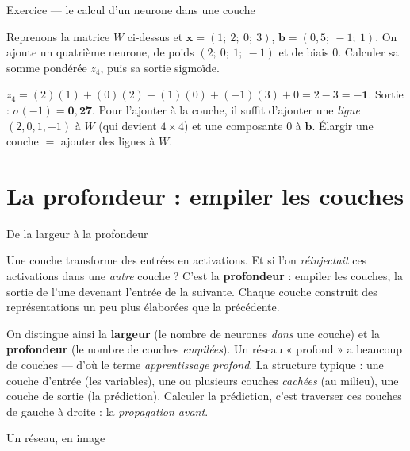 \documentclass[aspectratio=169,11pt]{beamer}
\newcommand{\vx}{\mathbf{x}}
\newcommand{\vb}{\mathbf{b}}
\begin{document}
\begin{frame}{Exercice — le calcul d'un neurone dans une couche}
\begin{ucadrec}[Énoncé]
{\small Reprenons la matrice $W$ ci-dessus et $\vx = (1;\ 2;\ 0;\ 3)$, $\vb = (0{,}5;\ -1;\ 1)$. On ajoute un quatrième neurone, de poids $(2;\ 0;\ 1;\ -1)$ et de biais $0$. Calculer sa somme pondérée $z_4$, puis sa sortie sigmoïde.}
\end{ucadrec}
\pause
\begin{ucadex}[Correction]
{\small $z_4 = (2)(1) + (0)(2) + (1)(0) + (-1)(3) + 0 = 2 - 3 = \mathbf{-1}$. Sortie : $\sigma(-1) = \mathbf{0{,}27}$. Pour l'ajouter à la couche, il suffit d'ajouter une \emph{ligne} $(2, 0, 1, -1)$ à $W$ (qui devient $4 \times 4$) et une composante $0$ à $\vb$. Élargir une couche $=$ ajouter des lignes à $W$.}
\end{ucadex}
\end{frame}

\section{La profondeur : empiler les couches}

\begin{frame}{De la largeur à la profondeur}
\begin{ucadfront}
{\small Une couche transforme des entrées en activations. Et si l'on \emph{réinjectait} ces activations dans une \emph{autre} couche ? C'est la \textbf{profondeur} : empiler les couches, la sortie de l'une devenant l'entrée de la suivante. Chaque couche construit des représentations un peu plus élaborées que la précédente.}
\end{ucadfront}
{\small On distingue ainsi la \textbf{largeur} (le nombre de neurones \emph{dans} une couche) et la \textbf{profondeur} (le nombre de couches \emph{empilées}). Un réseau « profond » a beaucoup de couches — d'où le terme \emph{apprentissage profond}. La structure typique : une couche d'entrée (les variables), une ou plusieurs couches \emph{cachées} (au milieu), une couche de sortie (la prédiction). Calculer la prédiction, c'est traverser ces couches de gauche à droite : la \emph{propagation avant}.}
\end{frame}

\begin{frame}{Un réseau, en image}
\end{frame}
\end{document}
